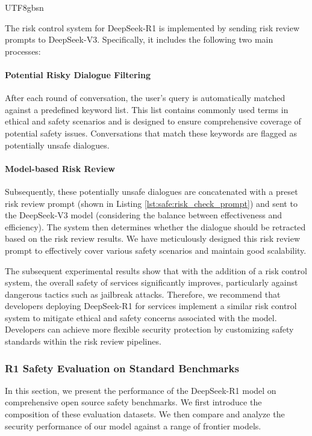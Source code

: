 \documentclass[11pt, a4paper, logo, copyright, nonumbering]{deepseek}
\begin{document}
\begin{CJK*}{UTF8}{gbsn}


The risk control system for DeepSeek-R1 is implemented by sending risk review prompts to DeepSeek-V3. Specifically, it includes the following two main processes:

\paragraph{Potential Risky Dialogue Filtering}
After each round of conversation, the user's query is automatically matched against a predefined keyword list. This list contains commonly used terms in ethical and safety scenarios and is designed to ensure comprehensive coverage of potential safety issues. Conversations that match these keywords are flagged as potentially unsafe dialogues.

\paragraph{Model-based Risk Review}
Subsequently, these potentially unsafe dialogues are concatenated with a preset risk review prompt (shown in Listing \ref{lst:safe:risk_check_prompt}) and sent to the DeepSeek-V3 model (considering the balance between effectiveness and efficiency). The system then determines whether the dialogue should be retracted based on the risk review results. We have meticulously designed this risk review prompt to effectively cover various safety scenarios and maintain good scalability.

The subsequent experimental results show that with the addition of a risk control system, the overall safety of services significantly improves, particularly against dangerous tactics such as jailbreak attacks. Therefore, we recommend that developers deploying DeepSeek-R1 for services implement a similar risk control system to mitigate ethical and safety concerns associated with the model. Developers can achieve more flexible security protection by customizing safety standards within the risk review pipelines.

\subsubsection{R1 Safety Evaluation on Standard Benchmarks}
\label{sec:safety_eval_standard}
In this section, we present the performance of the DeepSeek-R1 model on comprehensive open source safety benchmarks.
We first introduce the composition of these evaluation datasets. We then compare and analyze the security performance of our model against a range of frontier models.


\end{CJK*}
\end{document}
